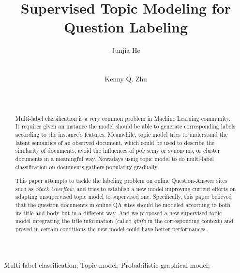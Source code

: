 \documentclass{sig-alternate}
\begin{document}
\title{Supervised Topic Modeling for Question Labeling}

\author{
\alignauthor
Junjia He\\
   \\
   \\
\alignauthor
Kenny Q. Zhu\\
   \\
   \\
}

\maketitle

\begin{abstract}
Multi-label classification is a very common problem in Machine Learning community. It requires given an instance the model should be able to generate corresponding labels according to the instance`s features. Meanwhile, topic model tries to understand the latent semantics of an observed document, which could be used to describe the similarity of documents, avoid the influences of polysemy or synonyms, or cluster documents in a meaningful way. Nowadays using topic model to do multi-label classification on documents gathers popularity gradually.

This paper attempts to tackle the labeling problem on online Question-Answer sites such as \emph{Stack Overflow}, and tries to establish a new model improving current efforts on adapting unsupervised topic model to supervised one. Specifically, this paper believed that the question documents in online QA sites should be modeled according to both its title and body but in a different way. And we proposed a new supervised topic model integrating the title information (called \emph{qinfo} in the corresponding context) and proved in certain conditions the new model could have better performances.
\end{abstract}

\begin{keywords}
Multi-label classification; Topic model; Probabilistic graphical model;
\end{keywords}










\end{document}

